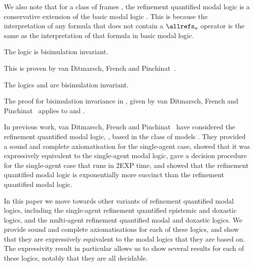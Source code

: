 We also note that for a class of frames \classC{}, the refinement quantified
modal logic \logicCF{} is a conservative extension of the basic modal logic
\logicC{}. This is because the interpretation of any formula that does not
contain a $\allrefs_a$ operator is the same as the interpretation of that
formula in basic modal logic.

\begin{lemma}
The logic \logicKF{} is bisimulation invariant.
\end{lemma}

This is proven by van Ditmarsch, French and Pinchinat~\cite{french2010future}.

\begin{lemma}
The logics \logicKDF{} and \logicSF{} are bisimulation invariant.
\end{lemma}

The proof for bisimulation invariance in \logicKF{}, given by van Ditmarsch,
French and Pinchinat~\cite{french2010future} applies to \logicSF{} and
\logicKDF{}.

In previous work, van Ditmarsch, French and Pinchinat~\cite{french2010future}
have considered the refinement quantified modal logic, \logicKF{}, based in the
class of models \classK{}. They provided a sound and complete axiomatisation for
the single-agent case, showed that it was expressively equivalent to the
single-agent modal logic, gave a decision procedure for the single-agent case
that runs in 2EXP time, and showed that the refinement quantified modal logic is
exponentially more succinct than the refinement quantified modal logic.

In this paper we move towards other variants of refinement quantified modal
logics, including the single-agent refinement quantified epistemic and doxastic
logics, and the multi-agent refinement quantified modal and doxastic logics. We
provide sound and complete axiomatisations for each of these logics, and show
that they are expressively equivalent to the modal logics that they are based
on. The expressivity result in particular allows us to show several results for
each of these logics, notably that they are all decidable.
